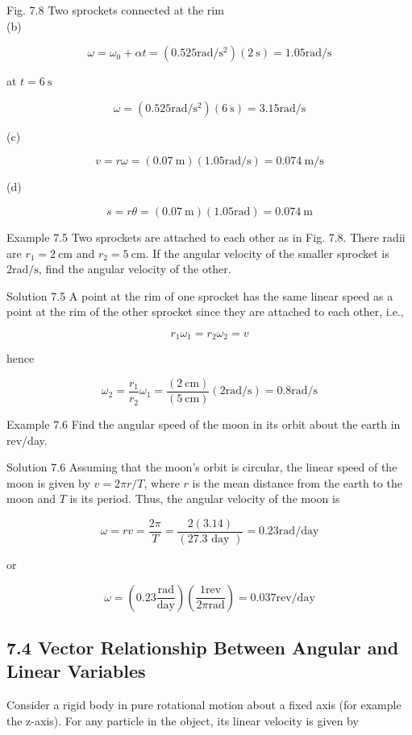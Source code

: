 \documentclass[10pt]{article}
\begin{document}
Fig. 7.8 Two sprockets connected at the rim\\
(b)

$$
\omega=\omega_{0}+\alpha t=\left(0.525 \mathrm{rad} / \mathrm{s}^{2}\right)(2 \mathrm{~s})=1.05 \mathrm{rad} / \mathrm{s}
$$

at $t=6 \mathrm{~s}$

$$
\omega=\left(0.525 \mathrm{rad} / \mathrm{s}^{2}\right)(6 \mathrm{~s})=3.15 \mathrm{rad} / \mathrm{s}
$$

(c)

$$
v=r \omega=(0.07 \mathrm{~m})(1.05 \mathrm{rad} / \mathrm{s})=0.074 \mathrm{~m} / \mathrm{s}
$$

(d)

$$
s=r \theta=(0.07 \mathrm{~m})(1.05 \mathrm{rad})=0.074 \mathrm{~m}
$$

Example 7.5 Two sprockets are attached to each other as in Fig. 7.8. There radii are $r_{1}=2 \mathrm{~cm}$ and $r_{2}=5 \mathrm{~cm}$. If the angular velocity of the smaller sprocket is $2 \mathrm{rad} / \mathrm{s}$, find the angular velocity of the other.

Solution 7.5 A point at the rim of one sprocket has the same linear speed as a point at the rim of the other sprocket since they are attached to each other, i.e.,

$$
r_{1} \omega_{1}=r_{2} \omega_{2}=v
$$

hence

$$
\omega_{2}=\frac{r_{1}}{r_{2}} \omega_{1}=\frac{(2 \mathrm{~cm})}{(5 \mathrm{~cm})}(2 \mathrm{rad} / \mathrm{s})=0.8 \mathrm{rad} / \mathrm{s}
$$

Example 7.6 Find the angular speed of the moon in its orbit about the earth in rev/day.

Solution 7.6 Assuming that the moon's orbit is circular, the linear speed of the moon is given by $v=2 \pi r / T$, where $r$ is the mean distance from the earth to the moon and $T$ is its period. Thus, the angular velocity of the moon is

$$
\omega=r v=\frac{2 \pi}{T}=\frac{2(3.14)}{(27.3 \text { day })}=0.23 \mathrm{rad} / \mathrm{day}
$$

or

$$
\omega=\left(0.23 \frac{\mathrm{rad}}{\mathrm{day}}\right)\left(\frac{1 \mathrm{rev}}{2 \pi \mathrm{rad}}\right)=0.037 \mathrm{rev} / \mathrm{day}
$$

\subsection*{7.4 Vector Relationship Between Angular and Linear Variables}
Consider a rigid body in pure rotational motion about a fixed axis (for example the z-axis). For any particle in the object, its linear velocity is given by
\end{document}
